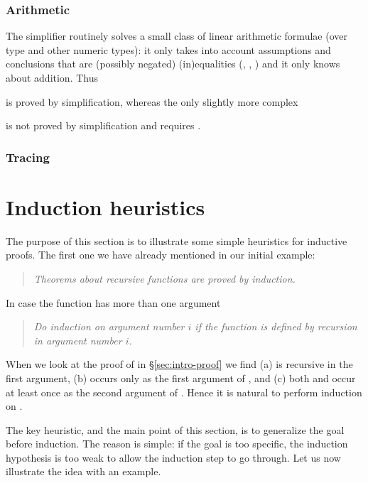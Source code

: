 \subsubsection{Arithmetic}

The simplifier routinely solves a small class of linear arithmetic formulae
(over type  and other numeric types): it only takes into account
assumptions and conclusions that are (possibly negated) (in)equalities
(\isa{=}, \isasymle, \isa{<}) and it only knows about addition. Thus

%
is proved by simplification, whereas the only slightly more complex

%
is not proved by simplification and requires .

\subsubsection{Tracing}

{\makeatother}


\section{Induction heuristics}
\label{sec:InductionHeuristics}

The purpose of this section is to illustrate some simple heuristics for
inductive proofs. The first one we have already mentioned in our initial
example:
\begin{quote}
\emph{Theorems about recursive functions are proved by induction.}
\end{quote}
In case the function has more than one argument
\begin{quote}
\emph{Do induction on argument number $i$ if the function is defined by
recursion in argument number $i$.}
\end{quote}
When we look at the proof of {\makeatother{}} in \S\ref{sec:intro-proof} we find (a) \isa{\at} is recursive in
the first argument, (b)  occurs only as the first argument of
\isa{\at}, and (c) both  and  occur at least once as
the second argument of \isa{\at}. Hence it is natural to perform induction
on .

The key heuristic, and the main point of this section, is to
generalize the goal before induction. The reason is simple: if the goal is
too specific, the induction hypothesis is too weak to allow the induction
step to go through. Let us now illustrate the idea with an example.


